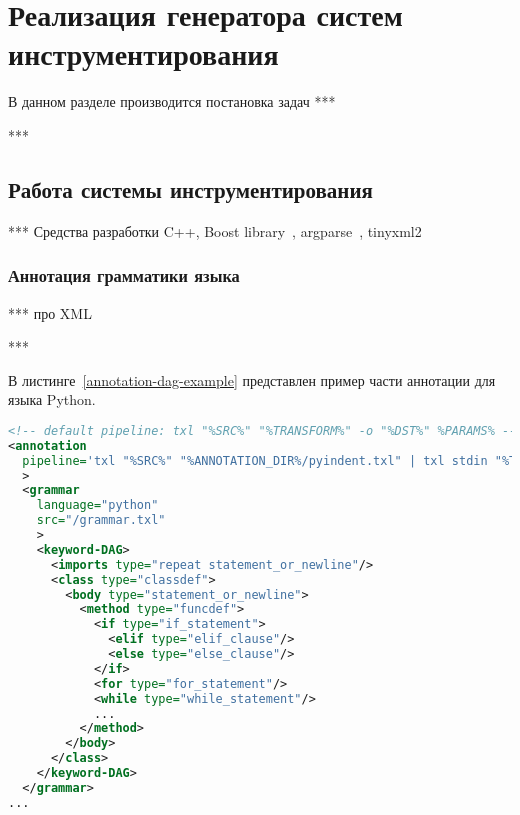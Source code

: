 \chapter{Реализация генератора систем инструментирования}

В данном разделе производится постановка задач ***

***

\section{Работа системы инструментирования}

***
Средства разработки
C++, Boost library~\cite{boost}, argparse~\cite{argparse}, tinyxml2~\cite{tinyxml2}

\subsection{Аннотация грамматики языка}

***
про XML

***

В листинге~\ref{annotation-dag-example} представлен пример части аннотации для языка Python.

\begin{lstlisting}[frame=single, language=XML, label={annotation-dag-example}, caption={Пример}]
<!-- default pipeline: txl "%SRC%" "%TRANSFORM%" -o "%DST%" %PARAMS% -->
<annotation
  pipeline='txl "%SRC%" "%ANNOTATION_DIR%/pyindent.txl" | txl stdin "%TRANSFORM%" -o "%DST%" %PARAMS%'
  >
  <grammar
    language="python"
    src="/grammar.txl"
    >
    <keyword-DAG>
      <imports type="repeat statement_or_newline"/>
      <class type="classdef">
        <body type="statement_or_newline">
          <method type="funcdef">
            <if type="if_statement">
              <elif type="elif_clause"/>
              <else type="else_clause"/>
            </if>
            <for type="for_statement"/>
            <while type="while_statement"/>
            ...
          </method>
        </body>
      </class>
    </keyword-DAG>
  </grammar>
...
\end{lstlisting}

